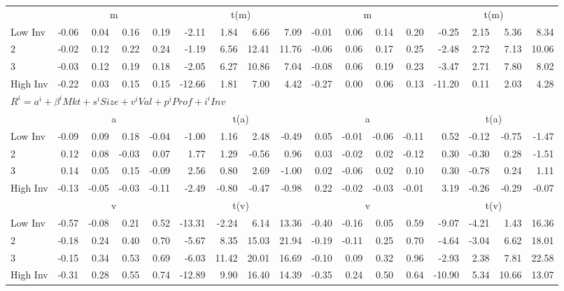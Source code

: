 \begin{tabular}{lrrrrrrrrrrrrrrrr}
  
     & \multicolumn{4}{c}{m} & \multicolumn{4}{c}{t(m)}  & \multicolumn{4}{c}{m} & \multicolumn{4}{c}{t(m)}   \\
     \cmidrule(r){2-5} \cmidrule(r){6-9}  \cmidrule(r){10-13} \cmidrule(r){14-17} 
    Low Inv  & -0.06  & 0.04  & 0.16  & 0.19  & -2.11  & 1.84  & 6.66  & 7.09  & -0.01  & 0.06  & 0.14  & 0.20  & -0.25  & 2.15  & 5.36  & 8.34   \\
    2  & -0.02  & 0.12  & 0.22  & 0.24  & -1.19  & 6.56  & 12.41  & 11.76  & -0.06  & 0.06  & 0.17  & 0.25  & -2.48  & 2.72  & 7.13  & 10.06   \\
    3  & -0.03  & 0.12  & 0.19  & 0.18  & -2.05  & 6.27  & 10.86  & 7.04  & -0.08  & 0.06  & 0.19  & 0.23  & -3.47  & 2.71  & 7.80  & 8.02   \\
    High Inv  & -0.22  & 0.03  & 0.15  & 0.15  & -12.66  & 1.81  & 7.00  & 4.42  & -0.27  & 0.00  & 0.06  & 0.13  & -11.20  & 0.11  & 2.03  & 4.28   \\
    
  
  \midrule
  \multicolumn{17}{l}{$R^i=a^i+\beta^iMkt+s^iSize+v^iVal+p^iProf+i^iInv$}  \\
  
     & \multicolumn{4}{c}{a} & \multicolumn{4}{c}{t(a)}  & \multicolumn{4}{c}{a} & \multicolumn{4}{c}{t(a)}   \\
     \cmidrule(r){2-5} \cmidrule(r){6-9}  \cmidrule(r){10-13} \cmidrule(r){14-17} 
    Low Inv  & -0.09  & 0.09  & 0.18  & -0.04  & -1.00  & 1.16  & 2.48  & -0.49  & 0.05  & -0.01  & -0.06  & -0.11  & 0.52  & -0.12  & -0.75  & -1.47   \\
    2  & 0.12  & 0.08  & -0.03  & 0.07  & 1.77  & 1.29  & -0.56  & 0.96  & 0.03  & -0.02  & 0.02  & -0.12  & 0.30  & -0.30  & 0.28  & -1.51   \\
    3  & 0.14  & 0.05  & 0.15  & -0.09  & 2.56  & 0.80  & 2.69  & -1.00  & 0.02  & -0.06  & 0.02  & 0.10  & 0.30  & -0.78  & 0.24  & 1.11   \\
    High Inv  & -0.13  & -0.05  & -0.03  & -0.11  & -2.49  & -0.80  & -0.47  & -0.98  & 0.22  & -0.02  & -0.03  & -0.01  & 3.19  & -0.26  & -0.29  & -0.07   \\
    
  
     & \multicolumn{4}{c}{v} & \multicolumn{4}{c}{t(v)}  & \multicolumn{4}{c}{v} & \multicolumn{4}{c}{t(v)}   \\
     \cmidrule(r){2-5} \cmidrule(r){6-9}  \cmidrule(r){10-13} \cmidrule(r){14-17} 
    Low Inv  & -0.57  & -0.08  & 0.21  & 0.52  & -13.31  & -2.24  & 6.14  & 13.36  & -0.40  & -0.16  & 0.05  & 0.59  & -9.07  & -4.21  & 1.43  & 16.36   \\
    2  & -0.18  & 0.24  & 0.40  & 0.70  & -5.67  & 8.35  & 15.03  & 21.94  & -0.19  & -0.11  & 0.25  & 0.70  & -4.64  & -3.04  & 6.62  & 18.01   \\
    3  & -0.15  & 0.34  & 0.53  & 0.69  & -6.03  & 11.42  & 20.01  & 16.69  & -0.10  & 0.09  & 0.32  & 0.96  & -2.93  & 2.38  & 7.81  & 22.58   \\
    High Inv  & -0.31  & 0.28  & 0.55  & 0.74  & -12.89  & 9.90  & 16.40  & 14.39  & -0.35  & 0.24  & 0.50  & 0.64  & -10.90  & 5.34  & 10.66  & 13.07   \\
    


\end{tabular}
